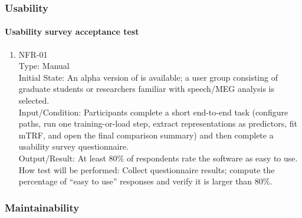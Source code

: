 \documentclass[12pt, titlepage]{article}
\begin{document}

					
					
					
					



\subsubsection{Usability}

\paragraph{Usability survey acceptance test}

\begin{enumerate}

\item{NFR-01\\}
Type: Manual \\
Initial State: An alpha version of \progname{} is available; a user group consisting of graduate students or researchers familiar with speech/MEG analysis is selected. \\
Input/Condition: Participants complete a short end-to-end task (configure paths, run one training-or-load step, extract representations as predictors, fit mTRF, and open the final comparison summary) and then complete a usability survey questionnaire. \\
Output/Result: At least 80\% of respondents rate the software as easy to use. \\
How test will be performed: Collect questionnaire results; compute the percentage of ``easy to use'' responses and verify it is larger than 80\%.

\end{enumerate}

\subsubsection{Maintainability}
\end{document}
